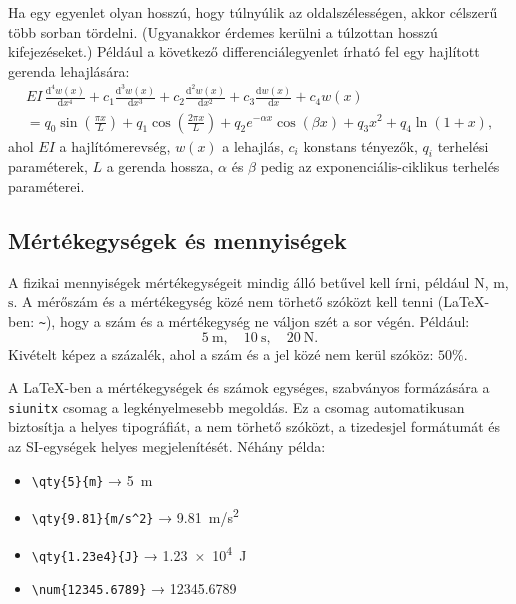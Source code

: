 \documentclass[fleqn,12pt]{article}
\begin{document}
    Ha egy egyenlet olyan hosszú, hogy túlnyúlik az oldalszélességen, akkor célszerű több sorban tördelni. (Ugyanakkor érdemes kerülni a túlzottan hosszú kifejezéseket.) Például a következő differenciálegyenlet írható fel egy hajlított gerenda lehajlására:
    \begin{multline}
        EI \, \frac{\mathrm{d}^4 w(x)}{\mathrm{d}x^4} 
        + c_1 \frac{\mathrm{d}^3 w(x)}{\mathrm{d}x^3}
        + c_2 \frac{\mathrm{d}^2 w(x)}{\mathrm{d}x^2}
        + c_3 \frac{\mathrm{d} w(x)}{\mathrm{d}x}
        + c_4 w(x) \\
        = q_0 \sin\!\left(\frac{\pi x}{L}\right)
        + q_1 \cos\!\left(\frac{2\pi x}{L}\right)
        + q_2 e^{-\alpha x} \cos(\beta x)
        + q_3 x^2
        + q_4 \ln(1+x),
    \end{multline}
    ahol $EI$ a hajlítómerevség, $w(x)$ a lehajlás, $c_i$ konstans tényezők, $q_i$ terhelési paraméterek, $L$ a gerenda hossza, $\alpha$ és $\beta$ pedig az exponenciális-ciklikus terhelés paraméterei.    

    \subsection{Mértékegységek és mennyiségek}

        A fizikai mennyiségek mértékegységeit mindig álló betűvel kell írni, például $\mathrm{N}$, $\mathrm{m}$, $\mathrm{s}$. A mérőszám és a mértékegység közé nem törhető szóközt kell tenni (LaTeX-ben: \texttt{\~}), hogy a szám és a mértékegység ne váljon szét a sor végén. Például:
        $$
        5~\mathrm{m}, \quad 10~\mathrm{s}, \quad 20~\mathrm{N}.
        $$
        Kivételt képez a százalék, ahol a szám és a jel közé nem kerül szóköz: $50\%$.

        \vspace{1em}
        A \LaTeX{}-ben a mértékegységek és számok egységes, szabványos formázására a \texttt{siunitx} csomag a legkényelmesebb megoldás. Ez a csomag automatikusan biztosítja a helyes tipográfiát, a nem törhető szóközt, a tizedesjel formátumát és az SI-egységek helyes megjelenítését. Néhány példa:
        \begin{itemize}
            \item \verb|\qty{5}{m}| → \qty{5}{m}
            \item \verb|\qty{9.81}{m/s^2}| → \qty{9.81}{m/s^2}
            \item \verb|\qty{1.23e4}{J}| → \qty{1.23e4}{J}
            \item \verb|\num{12345.6789}| → \num{12345.6789}
        \end{itemize}
\end{document}
